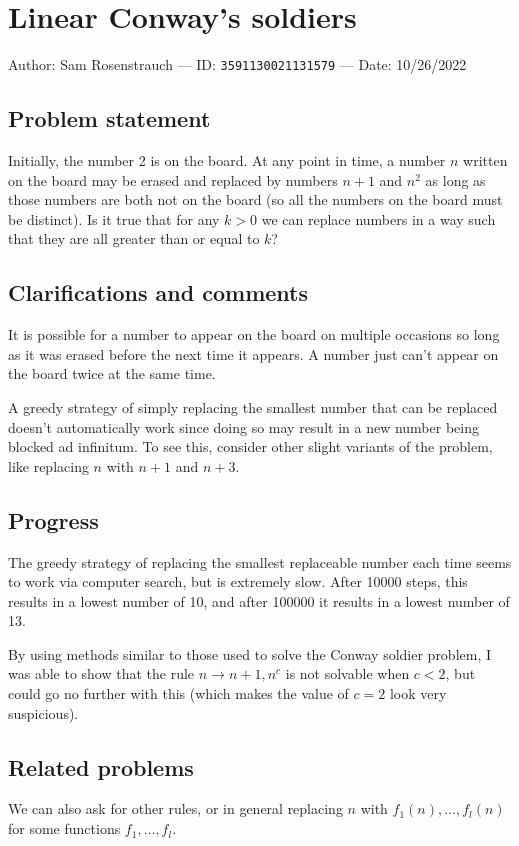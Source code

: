 
\section{Linear Conway's soldiers}

Author: Sam Rosenstrauch --- ID: \verb`3591130021131579` --- Date: 10/26/2022

\subsection{Problem statement}

Initially, the number 2 is on the board. At any point in time, a number $n$ written on the board may be erased and replaced by numbers $n+1$ and $n^2$ as long as those numbers are both not on the board (so all the numbers on the board must be distinct). Is it true that for any $k>0$ we can replace numbers in a way such that they are all greater than or equal to $k$?

\subsection{Clarifications and comments}

It is possible for a number to appear on the board on multiple occasions so long as it was erased before the next time it appears. A number just can't appear on the board twice at the same time.

A greedy strategy of simply replacing the smallest number that can be replaced doesn't automatically work since doing so may result in a new number being blocked ad infinitum. To see this, consider other slight variants of the problem, like replacing $n$ with $n+1$ and $n+3$.

\subsection{Progress}

The greedy strategy of replacing the smallest replaceable number each time seems to work via computer search, but is extremely slow. After 10000 steps, this results in a lowest number of 10, and after 100000 it results in a lowest number of 13.

By using methods similar to those used to solve the Conway soldier problem, I was able to show that the rule $n\to n+1,n^c$ is not solvable when $c<2$, but could go no further with this (which makes the value of $c=2$ look very suspicious).

\subsection{Related problems}

We can also ask for other rules, or in general replacing $n$ with $f_1(n),\ldots,f_l(n)$ for some functions $f_1,\ldots,f_l$.

